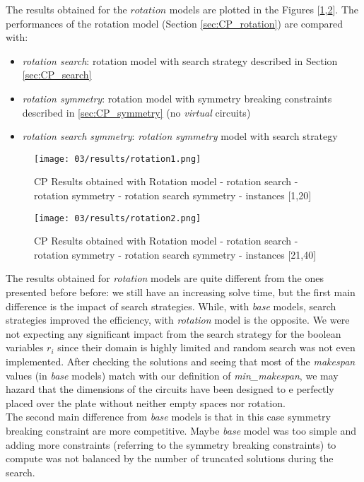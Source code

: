 The results obtained for the \(rotation\) models are plotted in the Figures [\ref{fig:CP_results_rotation1},\ref{fig:CP_results_rotation2}].
The performances of the rotation model (Section \ref{sec:CP_rotation}) are compared with:
\begin{itemize}
  \item \textit{rotation search}: rotation model with search strategy described in Section \ref{sec:CP_search}
  \item \textit{rotation symmetry}: rotation model with symmetry breaking constraints described in \ref{sec:CP_symmetry} (no \textit{virtual} circuits)
  \item \textit{rotation search symmetry}: \textit{rotation symmetry} model with search strategy
\end{itemize}

\begin{figure}[H]
  \centering
  \texttt{[image: 03/results/rotation1.png]}
  \caption{
    CP Results obtained with Rotation model - rotation search - rotation symmetry - rotation search symmetry - instances [1,20]
  }
  \label{fig:CP_results_rotation1}
\end{figure}
\begin{figure}[H]
  \centering
  \texttt{[image: 03/results/rotation2.png]}
  \caption{
    CP Results obtained with Rotation model - rotation search - rotation symmetry - rotation search symmetry - instances [21,40]
  }
  \label{fig:CP_results_rotation2}
\end{figure}

The results obtained for \textit{rotation} models are quite different from the ones presented before before: we still have an increasing solve 
time, but the first main difference is the impact of search strategies. 
While, with \textit{base} models, search strategies improved the efficiency, with \textit{rotation} model is the opposite.
We were not expecting any significant impact from the search strategy for the boolean variables \(r_i\) since their domain 
is highly limited and random search was not even implemented.
After checking the solutions and seeing that most of the \textit{makespan} values (in \textit{base} models) match with our 
definition of \textit{min\_makespan}, we may hazard that the dimensions of the circuits have been designed 
to e perfectly placed over the plate without neither empty spaces nor rotation. \\

The second main difference from \textit{base} models is that in this case symmetry breaking constraint are more competitive. 
Maybe \textit{base} model was too simple and adding more constraints (referring to the symmetry breaking constraints) to 
compute was not balanced by the number of truncated solutions during the search.\\

